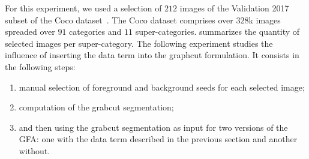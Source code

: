 \documentclass{siamart220329}
\begin{document}
For this experiment, we used a selection of $212$ images of the Validation 2017
subset of the Coco dataset~\cite{lin2014microsoft}. The Coco dataset comprises
over $328$k images spreaded over $91$ categories and $11$ super-categories.
 summarizes the quantity of selected
images per super-category. 
%
%
The following experiment studies the influence of inserting the data term into
the graphcut formulation. It consists in the following steps:
%
%
\begin{enumerate}
    \item{manual selection of foreground and background seeds for each selected
    image;} 
    \item{computation of the grabcut segmentation;} 
    \item{and then using the grabcut segmentation as input for two versions of
    the GFA: one with the data term described in the previous section and
    another without.}
\end{enumerate}
%
%
\end{document}
